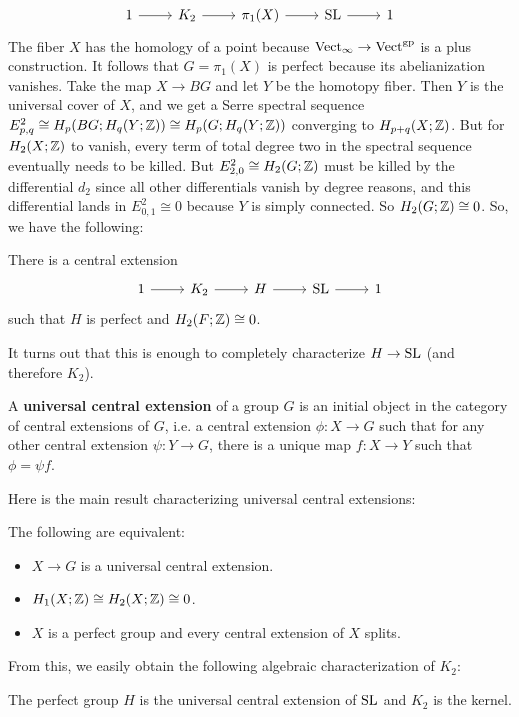 \[
    \begin{tikzcd}
        \arrow[from=1-1, to=1-2]
        \arrow[from=1-2, to=1-3]
        \arrow[from=1-3, to=1-4]
        \arrow[from=1-4, to=1-5]
        1 & K_2 & \pi_1(X) & \SL & 1
    \end{tikzcd}
\]
The fiber $X$ has the homology of a point because $\mathrm{Vect}_\infty \to \mathrm{Vect}^{\mathrm{gp}}$ is a plus construction. It follows that $G = \pi_1(X)$ is perfect because its abelianization vanishes. Take the map $X \to BG$ and let $Y$ be the homotopy fiber. Then $Y$ is the universal cover of $X$, and we get a Serre spectral sequence $E_{p, q}^2 \cong H_p(BG ; H_q(Y;\mathbb{Z})) \cong H_p(G ; H_q(Y;\mathbb{Z}))$ converging to $H_{p+q}(X;\mathbb{Z})$. But for $H_2(X;\mathbb{Z})$ to vanish, every term of total degree two in the spectral sequence eventually needs to be killed. But $E_{2, 0}^2 \cong H_2(G;\mathbb{Z})$ must be killed by the differential $d_2$ since all other differentials vanish by degree reasons, and this differential lands in $E_{0, 1}^2 \cong 0$ because $Y$ is simply connected. So $H_2(G;\mathbb{Z}) \cong 0$. So, we have the following:
\begin{proposition}
    There is a central extension
    \[
        \begin{tikzcd}
            \arrow[from=1-1, to=1-2]
            \arrow[from=1-2, to=1-3]
            \arrow[from=1-3, to=1-4]
            \arrow[from=1-4, to=1-5]
            1 & K_2 & H & \SL & 1
        \end{tikzcd}
    \]
    such that $H$ is perfect and $H_2(F ; \mathbb{Z}) \cong 0$.
\end{proposition}

It turns out that this is enough to completely characterize $H \to \mathrm{SL}$ (and therefore $K_2$).

\begin{definition}
    A \textbf{universal central extension} of a group $G$ is an initial object in the category of central extensions of $G$, i.e. a central extension $\phi : X \to G$ such that for any other central extension $\psi : Y \to G$, there is a unique map $f : X \to Y$ such that $\phi = \psi f$.
\end{definition}
Here is the main result characterizing universal central extensions:
\begin{theorem}
    The following are equivalent:
    \begin{itemize}
        \item $X \to G$ is a universal central extension.
        \item $H_1(X ; \mathbb{Z}) \cong H_2(X ; \mathbb{Z}) \cong 0$.
        \item $X$ is a perfect group and every central extension of $X$ splits.
    \end{itemize}
\end{theorem}
From this, we easily obtain the following algebraic characterization of $K_2$:
\begin{corollary}
    The perfect group $H$ is the universal central extension of $\mathrm{SL}$ and $K_2$ is the kernel.
\end{corollary}

